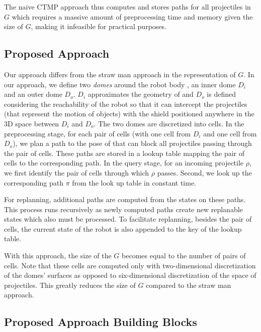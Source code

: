 \documentclass[a4paper]{report}
\begin{document}
The naive CTMP approach thus computes and stores paths for all projectiles in $G$ which requires a massive amount of preprocessing time and memory given the size of $G$, making it infeasible for practical purposes.

\subsection{Proposed Approach}
Our approach differs from the straw man approach in the representation of $G$. In our approach, we define two \emph{domes} around the robot body \calB, an inner dome $D_i$ and an outer dome $D_o$. $D_i$ approximates the geometry of \calB and $D_o$ is defined considering the reachability of the robot so that it can intercept the projectiles (that represent the motion of objects) with the shield \calS positioned anywhere in the 3D space between $D_i$ and $D_o$. The two domes are discretized into cells. In the preprocessing stage, for each pair of cells (with one cell from $D_i$ and one cell from $D_o$), we plan a path to the pose of \calS that can block all projectiles passing through the pair of cells. These paths are stored in a lookup table mapping the pair of cells to the corresponding path. In the query stage, for an incoming projectile $\rho$, we first identify the pair of cells through which $\rho$ passes. Second, we look up the corresponding path $\pi$ from the look up table in constant time. 

For replanning, additional paths are computed from the states on these paths. This process runs recursively as newly computed paths create new replanable states which also must be processed. To facilitate replanning, besides the pair of cells, the current state \Sstart of the robot is also appended to the key of the lookup table.

With this approach, the size of the $G$ becomes equal to the number of pairs of cells. Note that these cells are computed only with two-dimensional discretization of the domes' surfaces as opposed to six-dimensional discretization of the space of projectiles. This greatly reduces the size of $G$ compared to the straw man approach.

\subsection{Proposed Approach Building Blocks}
\end{document}
